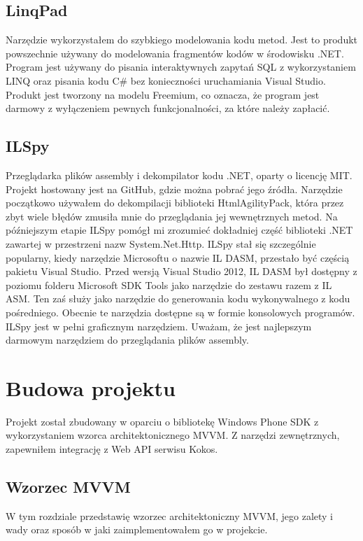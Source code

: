 \documentclass[a4paper,twoside,titlepage,openright]{book}
\begin{document}
\section{LinqPad}
Narzędzie wykorzystałem do szybkiego modelowania kodu metod. Jest to produkt powszechnie używany do modelowania fragmentów kodów w środowisku .NET. Program jest używany do pisania interaktywnych zapytań SQL z wykorzystaniem LINQ oraz pisania kodu C\# bez konieczności uruchamiania Visual Studio. \cite{linqPad} Produkt jest tworzony na modelu Freemium, co oznacza, że program jest darmowy z wyłączeniem pewnych funkcjonalności, za które należy zapłacić. \cite{linqPadWiki}



\section{ILSpy}
Przeglądarka plików assembly i dekompilator kodu .NET, oparty o licencję MIT. Projekt hostowany jest na GitHub, gdzie można pobrać jego źródła. \cite{ilSpyRepo} Narzędzie początkowo używałem do dekompilacji biblioteki HtmlAgilityPack, która przez zbyt wiele błędów zmusiła mnie do przeglądania jej wewnętrznych metod. Na późniejszym etapie ILSpy pomógł mi zrozumieć dokładniej część biblioteki .NET zawartej w przestrzeni nazw System.Net.Http. ILSpy stał się szczególnie popularny, kiedy narzędzie Microsoftu o nazwie IL DASM, przestało być częścią pakietu Visual Studio. Przed wersją Visual Studio 2012, IL DASM był dostępny z poziomu folderu Microsoft SDK Tools jako narzędzie do zestawu razem z IL ASM. Ten zaś służy jako narzędzie do generowania kodu wykonywalnego z kodu pośredniego. Obecnie te narzędzia dostępne są w formie konsolowych programów. ILSpy jest w pełni graficznym narzędziem. Uważam, że jest najlepszym darmowym narzędziem do przeglądania plików assembly.

 

\clearpage{\pagestyle{empty}\cleardoublepage}
\chapter{Budowa projektu}
Projekt został zbudowany w oparciu o bibliotekę Windows Phone SDK z wykorzystaniem wzorca architektonicznego MVVM. Z narzędzi zewnętrznych, zapewniłem integrację z Web API serwisu Kokos.

\section{Wzorzec MVVM}
W tym rozdziale przedstawię wzorzec architektoniczny MVVM, jego zalety i wady oraz sposób w jaki zaimplementowałem go w projekcie.
\end{document}
